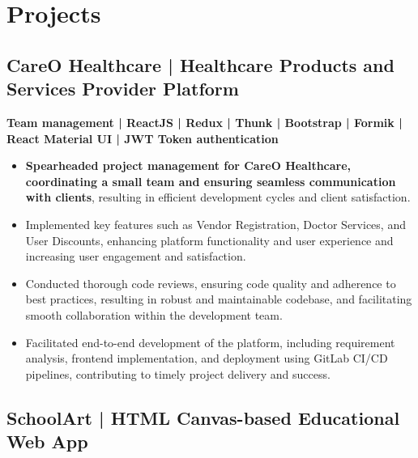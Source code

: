 \documentclass[letterpaper]{deedy-resume} %
\begin{document}
\begin{minipage}[t]{0.66\textwidth} %



\section{Projects}

\subsection{CareO Healthcare | Healthcare Products and Services Provider Platform}

\textbf{Team management | ReactJS | Redux | Thunk | Bootstrap | Formik | React Material UI | JWT Token authentication} \\
\vspace{-\topsep}
\begin{itemize}
    \setlength\itemsep{-0.5em} %
    \item \textbf{Spearheaded project management for CareO Healthcare, coordinating a small team and ensuring seamless communication with clients}, resulting in efficient development cycles and client satisfaction.
    \item Implemented key features such as Vendor Registration, Doctor Services, and User Discounts, enhancing platform functionality and user experience and increasing user engagement and satisfaction.
    \item Conducted thorough code reviews, ensuring code quality and adherence to best practices, resulting in robust and maintainable codebase, and facilitating smooth collaboration within the development team.
    \item Facilitated end-to-end development of the platform, including requirement analysis, frontend implementation, and deployment using GitLab CI/CD pipelines, contributing to timely project delivery and success.
\end{itemize}


\subsection{SchoolArt | HTML Canvas-based Educational Web App}



\end{minipage}
\end{document}
